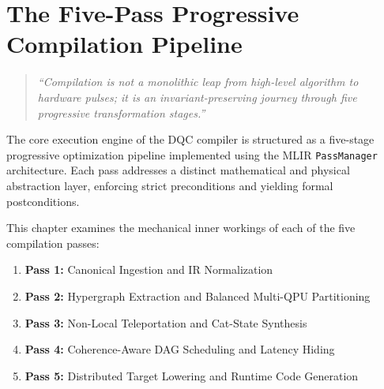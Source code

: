 \chapter{The Five-Pass Progressive Compilation Pipeline}
\label{ch:five_pass_pipeline}

\begin{quote}
\textit{``Compilation is not a monolithic leap from high-level algorithm to hardware pulses; it is an invariant-preserving journey through five progressive transformation stages.''}
\end{quote}

The core execution engine of the DQC compiler is structured as a five-stage progressive optimization pipeline implemented using the MLIR \texttt{PassManager} architecture. Each pass addresses a distinct mathematical and physical abstraction layer, enforcing strict preconditions and yielding formal postconditions. 

This chapter examines the mechanical inner workings of each of the five compilation passes:
\begin{enumerate}
    \item \textbf{Pass 1:} Canonical Ingestion and IR Normalization
    \item \textbf{Pass 2:} Hypergraph Extraction and Balanced Multi-QPU Partitioning
    \item \textbf{Pass 3:} Non-Local Teleportation and Cat-State Synthesis
    \item \textbf{Pass 4:} Coherence-Aware DAG Scheduling and Latency Hiding
    \item \textbf{Pass 5:} Distributed Target Lowering and Runtime Code Generation
\end{enumerate}

